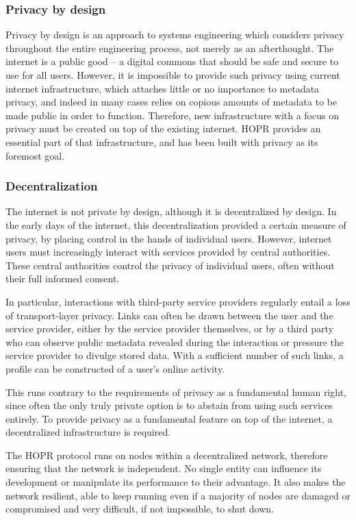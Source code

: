 \subsubsection{Privacy by design}
Privacy by design is an approach to systems engineering which considers privacy throughout the entire engineering process, not merely as an afterthought. The internet is a public good – a digital commons that should be safe and secure to use for all users. However, it is impossible to provide such privacy using current internet infrastructure, which attaches little or no importance to metadata privacy, and indeed in many cases relies on copious amounts of metadata to be made public in order to function. Therefore, new infrastructure with a focus on privacy must be created on top of the existing internet. HOPR provides an essential part of that infrastructure, and has been built with privacy as its foremost goal.

\subsubsection{Decentralization}
The internet is not private by design, although it is decentralized by design. In the early days of the internet, this decentralization provided a certain measure of privacy, by placing control in the hands of individual users. However, internet users must increasingly interact with services provided by central authorities. These central authorities control the privacy of individual users, often without their full informed consent.

In particular, interactions with third-party service providers regularly entail a loss of transport-layer privacy. Links can often be drawn between the user and the service provider, either by the service provider themselves, or by a third party who can observe public metadata revealed during the interaction or pressure the service provider to divulge stored data. With a sufficient number of such links, a profile can be constructed of a user's online activity.

This runs contrary to the requirements of privacy as a fundamental human right, since often the only truly private option is to abstain from using such services entirely. To provide privacy as a fundamental feature on top of the internet, a decentralized infrastructure is required.

The HOPR protocol runs on nodes within a decentralized network, therefore ensuring that the network is independent. No single entity can influence its development or manipulate its performance to their advantage. It also makes the network resilient, able to keep running even if a majority of nodes are damaged or compromised and very difficult, if not impossible, to shut down.

